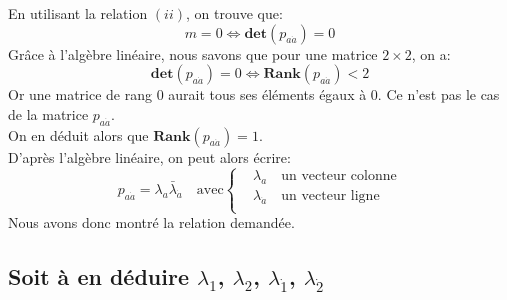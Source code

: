 \documentclass[12pt, a4paper]{article}
\begin{document}
		En utilisant la relation \((ii)\), on trouve que:
		\begin{equation}
			m=0 \Leftrightarrow \mathbf{det}(p_{a \dot{a}})=0
		\end{equation}
		Grâce à l'algèbre linéaire, nous savons que pour une matrice \(2\times2\), on a:
		\begin{equation}
		\mathbf{det}(p_{a \dot{a}})=0 \Leftrightarrow \mathbf{Rank}(p_{a \dot{a}}) < 2
		\end{equation}
		Or une matrice de rang \(0\) aurait tous ses éléments égaux à \(0\).
		Ce n'est pas le cas de la matrice \(p_{a \dot{a}}\).\\
		On en déduit alors que \(\mathbf{Rank}(p_{a \dot{a}})=1\).\\
		D'après l'algèbre linéaire, on peut alors écrire:
		\begin{equation}
			p_{a \dot{a}}=\lambda_a \bar{\lambda}_{\dot{a}} \quad\text{avec}\begin{cases}
				&\lambda_a  \quad \text{un vecteur colonne}\\
				&\lambda_{\dot{a}} \quad \text{un vecteur ligne}\\
			\end{cases} 
		\end{equation}
		Nous avons donc montré la relation demandée.
		
		\subsection{Soit à en déduire \(\lambda_1\), \(\lambda_2\), \(\lambda_{\dot{1}}\), \(\lambda_{\dot{2}}\)}
		
\end{document}
